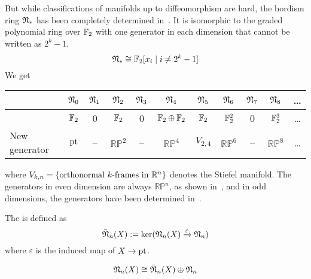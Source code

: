 \documentclass[a4paper,12pt]{article}
\begin{document}
But while classifications of manifolds up to diffeomorphism are hard, the bordism ring \(\mathfrak{N}_\ast\) has been completely determined in\ \cite{thom}. It is isomorphic to the graded polynomial ring over \(\mathbb{F}_2\) with one generator in each dimension that cannot be written as \(2^k-1\).
\[\mathfrak{N}_\ast\cong\mathbb{F}_2[x_i\mid i\neq 2^k-1]\]
We get \begin{center}
\begin{tabular}[c]{l|c|c|c|c|c|c|c|c|c|c}
    & $\mathfrak{N}_0$ & $\mathfrak{N}_1$ & $\mathfrak{N}_2$ & $\mathfrak{N}_3$ & $\mathfrak{N}_4$ & $\mathfrak{N}_5$ & $\mathfrak{N}_6$ & $\mathfrak{N}_7$ & $\mathfrak{N}_8$ & \dots\\ \hline
    & $\mathbb{F}_2$ & 0 & $\mathbb{F}_2$ & 0 & $\mathbb{F}_2\oplus\mathbb{F}_2$ & $\mathbb{F}_2$ & $\mathbb{F}_2^2$ & 0 & $\mathbb{F}_2^3$ & \dots\\ \hline
    New generator & $\mathrm{pt}$ & -- & $\mathbb{RP}^2$ & -- & $\mathbb{RP}^4$ & $V_{2,4}$ & $\mathbb{RP}^6$ & -- & $\mathbb{RP}^8$ & \dots
\end{tabular}
\end{center}
where \(V_{k,n}=\{\text{orthonormal }k\text{-frames in }\mathbb{R}^n\}\) denotes the Stiefel manifold. The generators in even dimension are always \(\mathbb{RP}^n\), as shown in\ \cite{thom}, and in odd dimensions, the generators have been determined in\ \cite{dold}.




\begin{definition}
    The  is defined as
    \[\tilde{\mathfrak{N}}_n(X):=\ker(\mathfrak{N}_n(X)\xrightarrow{\varepsilon}\mathfrak{N}_n)\]
    where \(\varepsilon\) is the induced map of \(X\to\mathrm{pt}\).
\end{definition}

\begin{remark}
    \[\mathfrak{N}_n(X)\cong\tilde{\mathfrak{N}}_n(X)\oplus\mathfrak{N}_n\]
\end{remark}
\end{document}
